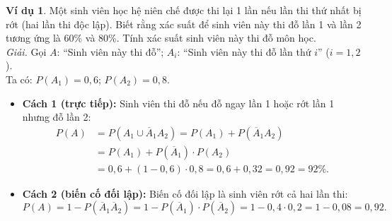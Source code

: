\documentclass[12pt,a4paper]{article}
\theoremstyle{definition}
\newtheorem{vidu}{Ví dụ}[section]
\begin{document}
\begin{vidu}
Một sinh viên học hệ niên chế được thi lại 1 lần nếu lần thi thứ nhất bị rớt (hai lần thi độc lập). Biết rằng xác suất để sinh viên này thi đỗ lần 1 và lần 2 tương ứng là 60\% và 80\%. Tính xác suất sinh viên này thi đỗ môn học.\\
\textit{Giải.} Gọi $A$: ``Sinh viên này thi đỗ''; $A_i$: ``Sinh viên này thi đỗ lần thứ $i$'' ($i = 1, 2$).\\
Ta có: $P(A_1) = 0{,}6$; $P(A_2) = 0{,}8$.
\begin{itemize}
    \item \textbf{Cách 1 (trực tiếp):} Sinh viên thi đỗ nếu đỗ ngay lần 1 hoặc rớt lần 1 nhưng đỗ lần 2:
    \begin{align*}
    P(A) &= P(A_1 \cup \overline{A}_1 A_2) = P(A_1) + P(\overline{A}_1 A_2) \\
         &= P(A_1) + P(\overline{A}_1) \cdot P(A_2) \\
         &= 0{,}6 + (1 - 0{,}6) \cdot 0{,}8 = 0{,}6 + 0{,}32 = 0{,}92 = 92\%.
    \end{align*}
    \item \textbf{Cách 2 (biến cố đối lập):} Biến cố đối lập là sinh viên rớt cả hai lần thi:
    \[
    P(A) = 1 - P(\overline{A}_1 \overline{A}_2) = 1 - P(\overline{A}_1) \cdot P(\overline{A}_2) = 1 - 0{,}4 \cdot 0{,}2 = 1 - 0{,}08 = 0{,}92.
    \]
\end{itemize}
\end{vidu}
\end{document}
